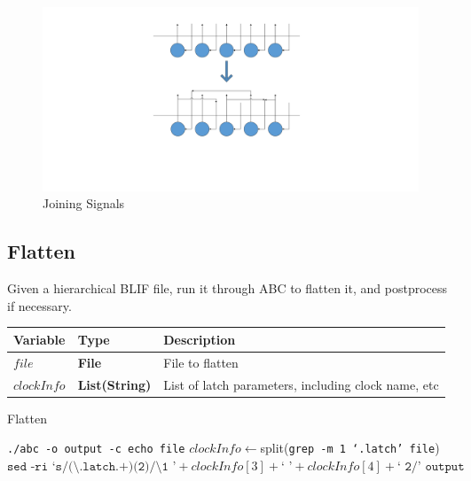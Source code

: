 \documentclass[12pt,final,oneside,a4paper]{dwThesis} %
\begin{document}
   \begin{figure}

      \begin{center}

         \includegraphics*[viewport=500 230 1200 800,width=\linewidth]{images/Join.pdf}
         \caption{Joining Signals} \label{imJoin} 
      \end{center}

   \end{figure}


   \newpage 
   \subsection{Flatten}
   \label{algFlatten} Given a
   hierarchical \gls{BLIF} file, run it through
   \gls{ABC} to flatten it, and postprocess if
   necessary.  
   \begin{algorithm}

      \begin{center}


         \begin{tabularx}
            {\linewidth}{llX} \toprule Variable & Type &
            Description\\
            \midrule $file$ &\textbf{File } &  File to
            flatten\\
            $clockInfo$ & \textbf{List(String)} & List of latch parameters, including clock name, etc\\
            \bottomrule 
         \end{tabularx}

      \end{center}

      \caption{Flatten}\label{Flatten} 
      \begin{algorithmic}
         [1]
         \State \texttt{./abc -o output -c echo file}
         \State $clockInfo \gets $split(\texttt{grep -m 1 `.latch' file})
         \State $\texttt{sed -ri `s/(\textbackslash.latch.+)(2)/\textbackslash1 '} + clockInfo[3] + \texttt{` '} +
         clockInfo[4] + \texttt{` 2/' output} $\EndIf \EndProcedure 
      \end{algorithmic}


   \end{algorithm}
\end{document}
